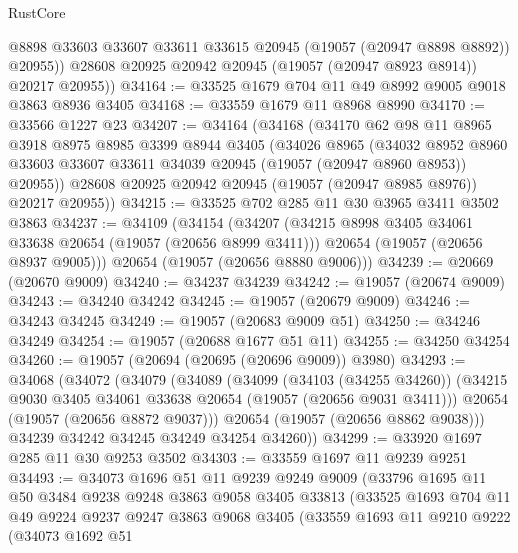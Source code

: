 \begin{lexlean}{RustCore}
\begin{coremodule}
            @8898
            @33603
            @33607
            @33611
            @33615
            @20945
            (@19057 (@20947 @8898 @8892))
            @20955))
        @28608
        @20925
        @20942
        @20945
        (@19057 (@20947 @8923 @8914))
        @20217
        @20955))
@34164 := @33525 @1679 @704 @11 @49 @8992 @9005 @9018 @3863 @8936 @3405
@34168 := @33559 @1679 @11 @8968 @8990
@34170 := @33566 @1227 @23
@34207 := @34164
    (@34168
      (@34170
        @62
        @98
        @11
        @8965
        @3918
        @8975
        @8985
        @3399
        @8944
        @3405
        (@34026
          @8965
          (@34032
            @8952
            @8960
            @33603
            @33607
            @33611
            @34039
            @20945
            (@19057 (@20947 @8960 @8953))
            @20955))
        @28608
        @20925
        @20942
        @20945
        (@19057 (@20947 @8985 @8976))
        @20217
        @20955))
@34215 := @33525 @702 @285 @11 @30 @3965 @3411 @3502 @3863
@34237 := @34109
    (@34154
      (@34207
        (@34215 @8998 @3405 @34061 @33638 @20654 (@19057 (@20656 @8999 @3411)))
        @20654
        (@19057 (@20656 @8937 @9005)))
      @20654
      (@19057 (@20656 @8880 @9006)))
@34239 := @20669 (@20670 @9009)
@34240 := @34237 @34239
@34242 := @19057 (@20674 @9009)
@34243 := @34240 @34242
@34245 := @19057 (@20679 @9009)
@34246 := @34243 @34245
@34249 := @19057 (@20683 @9009 @51)
@34250 := @34246 @34249
@34254 := @19057 (@20688 @1677 @51 @11)
@34255 := @34250 @34254
@34260 := @19057 (@20694 (@20695 (@20696 @9009)) @3980)
@34293 := @34068
    (@34072
      (@34079
        (@34089
          (@34099
            (@34103 (@34255 @34260))
            (@34215 @9030 @3405 @34061 @33638 @20654 (@19057 (@20656 @9031 @3411)))
            @20654
            (@19057 (@20656 @8872 @9037)))
          @20654
          (@19057 (@20656 @8862 @9038)))
        @34239
        @34242
        @34245
        @34249
        @34254
        @34260))
@34299 := @33920 @1697 @285 @11 @30 @9253 @3502
@34303 := @33559 @1697 @11 @9239 @9251
@34493 := @34073
    @1696
    @51
    @11
    @9239
    @9249
    @9009
    (@33796
      @1695
      @11
      @50
      @3484
      @9238
      @9248
      @3863
      @9058
      @3405
      @33813
      (@33525
        @1693
        @704
        @11
        @49
        @9224
        @9237
        @9247
        @3863
        @9068
        @3405
        (@33559
          @1693
          @11
          @9210
          @9222
          (@34073
            @1692
            @51

\end{coremodule}
\end{lexlean}

